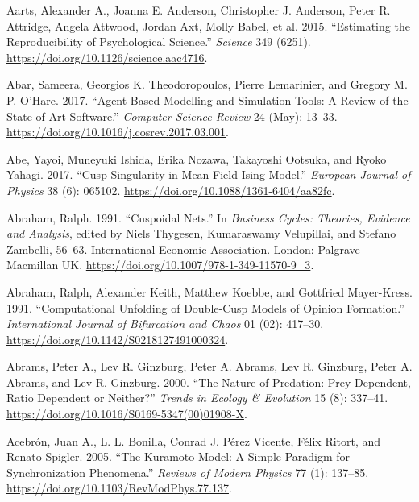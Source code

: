 \documentclass[
  a4paper,
  DIV=11,
  numbers=noendperiod,
  oneside]{scrreprt}
\newlength{\cslhangindent}
\newenvironment{CSLReferences}[2] %
 {\begin{list}{}{%
  \setlength{\itemindent}{0pt}
  \setlength{\leftmargin}{0pt}
  \setlength{\parsep}{0pt}
  \ifodd #1
   \setlength{\leftmargin}{\cslhangindent}
   \setlength{\itemindent}{-1\cslhangindent}
  \fi
  \setlength{\itemsep}{#2\baselineskip}}}
 {\end{list}}
\begin{document}
\label{refs}
\begin{CSLReferences}{1}{0}
Aarts, Alexander A., Joanna E. Anderson, Christopher J. Anderson, Peter
R. Attridge, Angela Attwood, Jordan Axt, Molly Babel, et al. 2015.
{``Estimating the Reproducibility of Psychological Science.''}
\emph{Science} 349 (6251).
\url{https://doi.org/10.1126/science.aac4716}.

Abar, Sameera, Georgios K. Theodoropoulos, Pierre Lemarinier, and
Gregory M. P. O'Hare. 2017. {``Agent {Based Modelling} and {Simulation}
Tools: {A} Review of the State-of-Art Software.''} \emph{Computer
Science Review} 24 (May): 13--33.
\url{https://doi.org/10.1016/j.cosrev.2017.03.001}.

Abe, Yayoi, Muneyuki Ishida, Erika Nozawa, Takayoshi Ootsuka, and Ryoko
Yahagi. 2017. {``Cusp Singularity in Mean Field {Ising} Model.''}
\emph{European Journal of Physics} 38 (6): 065102.
\url{https://doi.org/10.1088/1361-6404/aa82fc}.

Abraham, Ralph. 1991. {``Cuspoidal {Nets}.''} In \emph{Business
{Cycles}: {Theories}, {Evidence} and {Analysis}}, edited by Niels
Thygesen, Kumaraswamy Velupillai, and Stefano Zambelli, 56--63.
International {Economic Association}. {London}: {Palgrave Macmillan UK}.
\url{https://doi.org/10.1007/978-1-349-11570-9_3}.

Abraham, Ralph, Alexander Keith, Matthew Koebbe, and Gottfried
Mayer-Kress. 1991. {``Computational Unfolding of Double-Cusp Models of
Opinion Formation.''} \emph{International Journal of Bifurcation and
Chaos} 01 (02): 417--30.
\url{https://doi.org/10.1142/S0218127491000324}.

Abrams, Peter A., Lev R. Ginzburg, Peter A. Abrams, Lev R. Ginzburg,
Peter A. Abrams, and Lev R. Ginzburg. 2000. {``The Nature of Predation:
Prey Dependent, Ratio Dependent or Neither?''} \emph{Trends in Ecology
\& Evolution} 15 (8): 337--41.
\url{https://doi.org/10.1016/S0169-5347(00)01908-X}.

Acebrón, Juan A., L. L. Bonilla, Conrad J. Pérez Vicente, Félix Ritort,
and Renato Spigler. 2005. {``The {Kuramoto} Model: {A} Simple Paradigm
for Synchronization Phenomena.''} \emph{Reviews of Modern Physics} 77
(1): 137--85. \url{https://doi.org/10.1103/RevModPhys.77.137}.


\end{CSLReferences}
\end{document}
